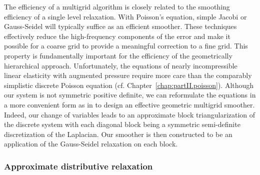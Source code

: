 The efficiency of a multigrid algorithm is closely related to the smoothing efficiency of a single level relaxation. With Poisson's equation, simple Jacobi or Gauss-Seidel will typically suffice as an efficient smoother. These techniques effectively reduce the high-frequency components of the error and make it possible for a coarse grid to provide a meaningful correction to a fine grid. This property is fundamentally important for the efficiency of the geometrically hierarchical approach. Unfortunately, the equations of nearly incompressible linear elasticity with augmented pressure require more care than the comparably simplistic discrete Poisson equation (cf. Chapter~\ref{chap:partII.poisson}). Although our system is not symmetric positive definite, we can reformulate the equations in a more convenient form as in \cite{Zhu.Yongning10} to design an effective geometric multigrid smoother. Indeed, our change of variables leads to an approximate block triangularization of the discrete system with each diagonal block being a symmetric semi-definite discretization of the Laplacian. Our smoother is then constructed to be an application of the Gauss-Seidel relaxation on each block.

\subsubsection{Approximate distributive relaxation} \label{subsubsec:chap5.multigrid.relaxation.distributive}


